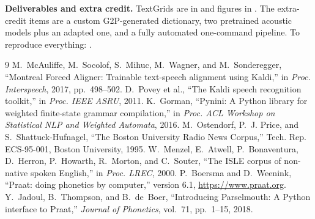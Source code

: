 \textbf{Deliverables and extra credit.} TextGrids are in  and figures in .
The extra-credit items are a custom G2P-generated dictionary, two pretrained acoustic models plus an adapted one, and a fully automated one-command pipeline. To reproduce everything: .
\begin{thebibliography}{9}\footnotesize\setlength\itemsep{0pt}
{} M.~McAuliffe, M.~Socolof, S.~Mihuc, M.~Wagner, and M.~Sonderegger, ``Montreal Forced Aligner: Trainable text-speech alignment using Kaldi,'' in \emph{Proc. Interspeech}, 2017, pp.~498--502.
 D.~Povey et al., ``The Kaldi speech recognition toolkit,'' in \emph{Proc. IEEE ASRU}, 2011.
 K.~Gorman, ``Pynini: A Python library for weighted finite-state grammar compilation,'' in \emph{Proc. ACL Workshop on Statistical NLP and Weighted Automata}, 2016.
 M.~Ostendorf, P.~J. Price, and S.~Shattuck-Hufnagel, ``The Boston University Radio News Corpus,'' Tech. Rep. ECS-95-001, Boston University, 1995.
 W.~Menzel, E.~Atwell, P.~Bonaventura, D.~Herron, P.~Howarth, R.~Morton, and C.~Souter, ``The ISLE corpus of non-native spoken English,'' in \emph{Proc. LREC}, 2000.
 P.~Boersma and D.~Weenink, ``Praat: doing phonetics by computer,'' version 6.1, \url{https://www.praat.org}.
 Y.~Jadoul, B.~Thompson, and B.~de~Boer, ``Introducing Parselmouth: A Python interface to Praat,'' \emph{Journal of Phonetics}, vol.~71, pp.~1--15, 2018.
\end{thebibliography}
